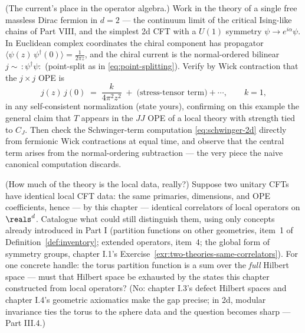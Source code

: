 \begin{exercise}[classic]
\label{exr:current-block}
(The current's place in the operator algebra.) Work in the theory of a
single free massless Dirac fermion in $d = 2$ --- the continuum limit of the
critical Ising-like chains of Part VIII, and the simplest 2d CFT with a
$U(1)$ symmetry $\psi \to e^{i\alpha}\psi$. In Euclidean complex
coordinates the chiral component has propagator $\langle \psi(z)\,
\psi^\dagger(0)\rangle = \frac{1}{2\pi z}$, and the chiral current is the
normal-ordered bilinear $j \sim\, :\!\psi^\dagger\psi\!:$ (point-split as in
\eqref{eq:point-splitting}). Verify by Wick contraction that the $j \times
j$ OPE is
\begin{equation*}
j(z)\, j(0) \;=\; \frac{k}{4\pi^2 z^2}
\;+\; \big(\text{stress-tensor term}\big) + \cdots,
\qquad k = 1,
\end{equation*}
in any self-consistent normalization (state yours), confirming on this
example the general claim that $T$ appears in the $JJ$ OPE of a local
theory with strength tied to $C_J$. Then check the Schwinger-term
computation \eqref{eq:schwinger-2d} directly from fermionic Wick contractions
at equal time, and observe that the central term arises from the
normal-ordering subtraction --- the very piece the naive canonical
computation discards.
\end{exercise}

\begin{exercise}[thinker]
\label{exr:data-vs-theory}
(How much of the theory is the local data, really?) Suppose two unitary
CFTs have identical local CFT data: the same primaries, dimensions, and OPE
coefficients, hence --- by this chapter --- identical correlators of local
operators on $\reals^d$. Catalogue what could still distinguish them, using
only concepts already introduced in Part I (partition functions on other
geometries, item~1 of Definition~\ref{def:inventory}; extended operators,
item~4; the global form of symmetry groups, chapter I.1's
Exercise~\ref{exr:two-theories-same-correlators}). For one concrete handle:
the torus partition function is a sum over the \emph{full} Hilbert space ---
must that Hilbert space be exhausted by the states this chapter constructed
from local operators? (No: chapter I.3's defect Hilbert spaces and chapter
I.4's geometric axiomatics make the gap precise; in 2d, modular invariance
ties the torus to the sphere data and the question becomes sharp ---
Part III.4.)
\end{exercise}

